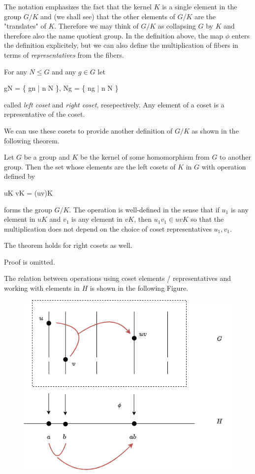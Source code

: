 The notation emphasizes the fact that the kernel $K$ is a single element in the group $G/K$ and (we shall see) that the other elements of $G/K$ are the "translates" of $K$. Therefore we may think of $G/K$ as collapsing $G$ by $K$ and therefore also the name quotient group. In the definition above, the map $\phi$ enters the definition explicitely, but we can also define the multiplication of fibers in terms of \emph{representatives} from the fibers.

\begin{definition}
For any $N \leq G$ and any $g \in G$ let

\bee
gN = \{ gn | n \in N \}, \quad Ng = \{ ng | n \in N \}
\eee

called \emph{left coset} and \emph{right coset}, resepectively. Any element of a coset is a representative of the coset.

\end{definition}

We can use these cosets to provide another definition of $G/K$ as shown in the following theorem.

\begin{theorem}
Let $G$ be a group and $K$ be the kernel of some homomorphism from $G$ to another group. Then the set whose elements are the left cosets of $K$ in $G$ with operation defined by

\bee
uK \cdot vK = (uv)K
\eee

forms the group $G/K$. The operation is well-defined in the sense that if $u_1$ is any element in $uK$ and $v_1$ is any element in $vK$, then $u_1 v_1 \in uvK$ so that the multiplication does not depend on the choice of coset representatives $u_1, v_1$.

The theorem holds for right cosets as well.
\end{theorem}

Proof is omitted.

The relation between operations using coset elements / representatives and working with elements in $H$ is shown in the following Figure.

\begin{figure}[H]
\centering
\includegraphics[scale=0.55]{images/2023-07-17-quotient_group.png}
\end{figure}

